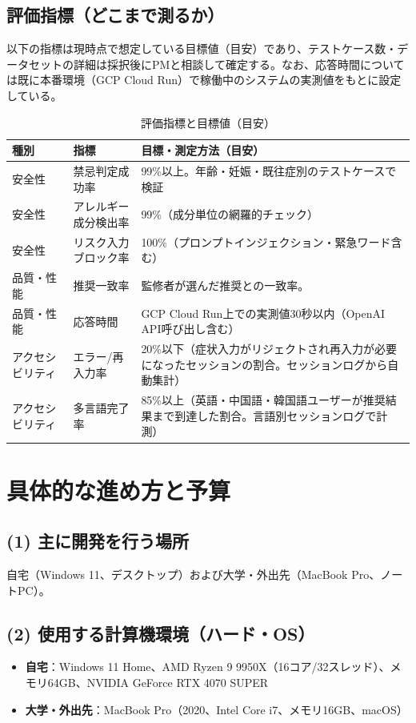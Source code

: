 \documentclass[11pt,a4paper,ja=minimal,xelatex]{bxjsarticle}
\begin{document}
\subsection*{評価指標（どこまで測るか）}
以下の指標は現時点で想定している目標値（目安）であり、テストケース数・データセットの詳細は採択後にPMと相談して確定する。なお、応答時間については既に本番環境（GCP Cloud Run）で稼働中のシステムの実測値をもとに設定している。
\begin{table}[H]
\centering
\caption{評価指標と目標値（目安）}
\label{tab:metrics}
\begin{tabularx}{\linewidth}{llX}
\toprule
種別 & 指標 & 目標・測定方法（目安） \\
\midrule
安全性 & 禁忌判定成功率 & 99\%以上。年齢・妊娠・既往症別のテストケースで検証 \\
安全性 & アレルギー成分検出率 & 99\%（成分単位の網羅的チェック） \\
安全性 & リスク入力ブロック率 & 100\%（プロンプトインジェクション・緊急ワード含む） \\
品質・性能 & 推奨一致率 & 監修者が選んだ推奨との一致率。\\
品質・性能 & 応答時間 & GCP Cloud Run上での実測値30秒以内（OpenAI API呼び出し含む） \\
アクセシビリティ & エラー/再入力率 & 20\%以下（症状入力がリジェクトされ再入力が必要になったセッションの割合。セッションログから自動集計） \\
アクセシビリティ & 多言語完了率 & 85\%以上（英語・中国語・韓国語ユーザーが推奨結果まで到達した割合。言語別セッションログで計測） \\
\bottomrule
\end{tabularx}
\end{table}

\section*{ 具体的な進め方と予算}

\subsection*{(1) 主に開発を行う場所}
自宅（Windows 11、デスクトップ）および大学・外出先（MacBook Pro、ノートPC）。

\subsection*{(2) 使用する計算機環境（ハード・OS）}
\begin{itemize}[nosep,leftmargin=1em]
  \item \textbf{自宅}：Windows 11 Home、AMD Ryzen 9 9950X（16コア/32スレッド）、メモリ64GB、NVIDIA GeForce RTX 4070 SUPER
  \item \textbf{大学・外出先}：MacBook Pro（2020、Intel Core i7、メモリ16GB、macOS）
\end{itemize}
\end{document}
